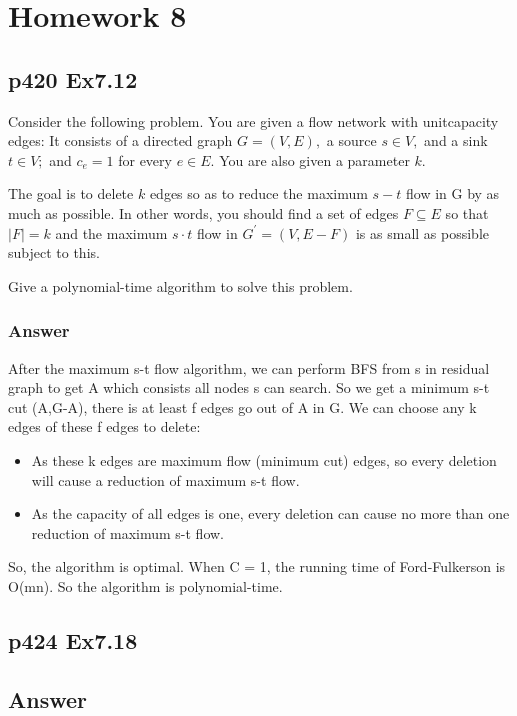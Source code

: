 \documentclass[a4paper]{article}
\begin{document}
\newpage
\section*{Homework 8}
\subsection*{p420 Ex7.12}
\begin{adjustwidth}{1cm}{1cm}
	Consider the following problem. You are given a flow network with unitcapacity edges: It consists of a directed graph $G=(V, E),$ a source $s \in V,$ and a sink $t \in V ;$ and $c_{e}=1$ for every $e \in E$. You are also given a parameter $k$.

	The goal is to delete $k$ edges so as to reduce the maximum $s-t$ flow in G by as much as possible. In other words, you should find a set of edges $F \subseteq E$ so that $|F|=k$ and the maximum $s \cdot t$ flow in $G^{\prime}=(V, E-F)$ is as small as possible subject to this.

	Give a polynomial-time algorithm to solve this problem.
\end{adjustwidth}

\subsubsection*{Answer}
After the maximum s-t flow algorithm, we can perform BFS from s in residual graph to get A which consists all nodes s can search. So we get a minimum s-t cut (A,G-A), there is at least f edges go out of A in G. We can choose any k edges of these f edges to delete:
\begin{itemize}
	\item As these k edges are maximum flow (minimum cut) edges, so every deletion will cause a reduction of maximum s-t flow.
	\item As the capacity of all edges is one, every deletion can cause no more than one reduction of maximum s-t flow.
\end{itemize}
So, the algorithm is optimal. When C = 1, the running time of Ford-Fulkerson is O(mn). So the algorithm is polynomial-time.
\vspace{1cm}

\subsection*{p424 Ex7.18}
\subsection*{Answer}
\end{document}
